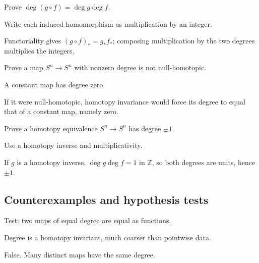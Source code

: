 \begin{exercise}[Multiplicativity]\label{exr:viii03-ped-07}
Prove $\deg(g\circ f)=\deg g\deg f$.
\end{exercise}
\begin{hint}
Write each induced homomorphism as multiplication by an integer.
\end{hint}
\begin{solution}
Functoriality gives $(g\circ f)_*=g_*f_*$; composing multiplication by the two degrees multiplies the integers.
\end{solution}

\begin{exercise}\label{exr:viii03-ped-08}
Prove a map $S^n\to S^n$ with nonzero degree is not null-homotopic.
\end{exercise}
\begin{hint}
A constant map has degree zero.
\end{hint}
\begin{solution}
If it were null-homotopic, homotopy invariance would force its degree to equal that of a constant map, namely zero.
\end{solution}

\begin{exercise}\label{exr:viii03-ped-09}
Prove a homotopy equivalence $S^n\to S^n$ has degree $\pm1$.
\end{exercise}
\begin{hint}
Use a homotopy inverse and multiplicativity.
\end{hint}
\begin{solution}
If $g$ is a homotopy inverse, $\deg g\deg f=1$ in $\mathbb Z$, so both degrees are units, hence $\pm1$.
\end{solution}

\subsection*{Counterexamples and hypothesis tests}

\begin{exercise}\label{exr:viii03-ped-10}
Test: two maps of equal degree are equal as functions.
\end{exercise}
\begin{hint}
Degree is a homotopy invariant, much coarser than pointwise data.
\end{hint}
\begin{solution}
False.  Many distinct maps have the same degree.
\end{solution}

